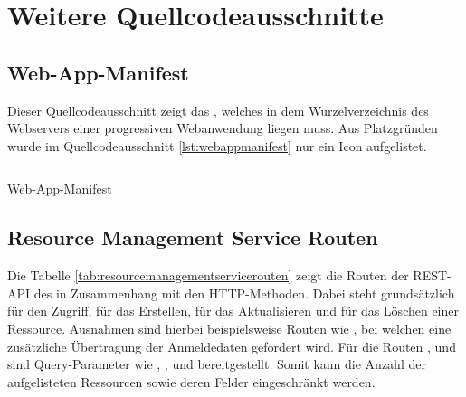 \chapter{Weitere Quellcodeausschnitte}
\label{chap:weiterequellcodeausschnitte}

\section*{Web-App-Manifest}
\label{sec:webappmanifest}
Dieser Quellcodeausschnitt zeigt das , welches in dem Wurzelverzeichnis
des Webservers einer progressiven Webanwendung liegen muss. Aus Platzgründen wurde im Quellcodeausschnitt
\ref{lst:webappmanifest} nur ein Icon aufgelistet.

\begin{listing}[h]
    \inputminted{jsx}{snippets/json/manifest.json}
    \caption{Web-App-Manifest}
    \label{lst:webappmanifest}
\end{listing}

\newpage

\section*{Resource Management Service Routen}
\label{sec:resourcemanagementservicerouten}
Die Tabelle \ref{tab:resourcemanagementservicerouten} zeigt die
Routen der REST-API des  in Zusammenhang
mit den HTTP-Methoden. Dabei steht grundsätzlich  für den Zugriff,
 für das Erstellen,  für das Aktualisieren und 
für das Löschen einer Ressource. Ausnahmen sind hierbei beispielsweise Routen wie
, bei welchen eine zusätzliche Übertragung der Anmeldedaten
gefordert wird. Für die Routen ,  und 
sind Query-Parameter wie , ,  und
 bereitgestellt. Somit kann die Anzahl der aufgelisteten Ressourcen
sowie deren Felder eingeschränkt werden.

